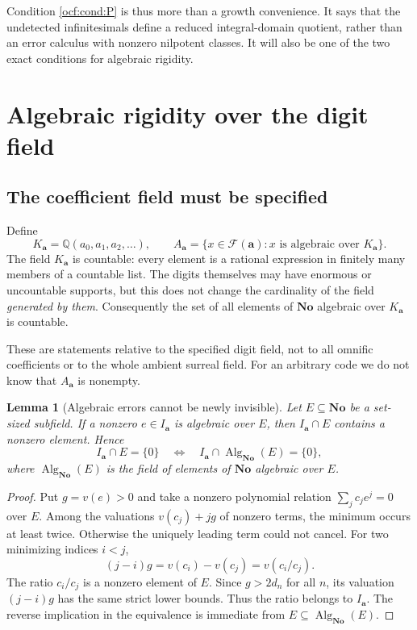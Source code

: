 \documentclass[11pt,a4paper]{article}
\numberwithin{equation}{section}
\newtheorem{lemma}[theorem]{Lemma}
\theoremstyle{definition}
\theoremstyle{remark}
\newcommand{\No}{\mathbf{No}}
\newcommand{\Q}{\mathbb Q}
\newcommand{\F}{\mathcal F}
\newcommand{\alg}{\operatorname{Alg}}
\newcommand{\codea}{\boldsymbol a}
\begin{document}
Condition \eqref{ocf:cond:P} is thus more than a growth convenience. It says
that the undetected infinitesimals define a reduced integral-domain
quotient, rather than an error calculus with nonzero nilpotent classes.
It will also be one of the two exact conditions for algebraic rigidity.

\section{Algebraic rigidity over the digit field}
\label{ocf:sec:algebraic}

\subsection{The coefficient field must be specified}

Define
\[
 K_{\codea}=\Q(a_0,a_1,a_2,\ldots),\qquad
 A_{\codea}=\{x\in\F(\codea):x\text{ is algebraic over }K_{\codea}\}.
\]
The field $K_{\codea}$ is countable: every element is a rational expression
in finitely many members of a countable list. The digits themselves may
have enormous or uncountable supports, but this does not change the
cardinality of the field \emph{generated by them}. Consequently the set of
all elements of $\No$ algebraic over $K_{\codea}$ is countable.

These are statements relative to the specified digit field, not to all
omnific coefficients or to the whole ambient surreal field. For an
arbitrary code we do not know that $A_{\codea}$ is nonempty.

\begin{lemma}[Algebraic errors cannot be newly invisible]
\label{ocf:lem:algerror}
Let $E\subseteq\No$ be a set-sized subfield. If a nonzero
$e\in I_{\codea}$ is algebraic over $E$, then
$I_{\codea}\cap E$ contains a nonzero element. Hence
\[
 I_{\codea}\cap E=\{0\}
 \quad\Longleftrightarrow\quad
 I_{\codea}\cap\alg_{\No}(E)=\{0\},
\]
where $\alg_{\No}(E)$ is the field of elements of $\No$ algebraic over $E$.
\end{lemma}
\begin{proof}
Put $g=v(e)>0$ and take a nonzero polynomial relation
$\sum_j c_je^j=0$ over $E$. Among the valuations $v(c_j)+jg$ of nonzero
terms, the minimum occurs at least twice. Otherwise the uniquely leading
term could not cancel. For two minimizing indices $i<j$,
\[
 (j-i)g=v(c_i)-v(c_j)=v(c_i/c_j).
\]
The ratio $c_i/c_j$ is a nonzero element of $E$. Since $g>2d_n$ for all
$n$, its valuation $(j-i)g$ has the same strict lower bounds. Thus the
ratio belongs to $I_{\codea}$. The reverse implication in the equivalence
is immediate from $E\subseteq\alg_{\No}(E)$.
\end{proof}
\end{document}

